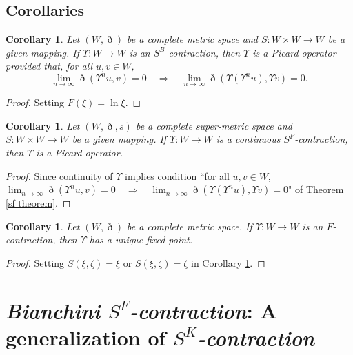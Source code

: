 \documentclass[pdflatex,sn-mathphys-num]{sn-jnl}%
\theoremstyle{thmstyleone}%
\theoremstyle{thmstyletwo}%
\newtheorem{corollary}[theorem]{Corollary}
\theoremstyle{thmstylethree}%
\begin{document}
\subsection{Corollaries}

    \begin{corollary}\cite{bessem}
   Let $(W,\eth)$ be a complete metric space and $S:W\times W \to W$ be a given mapping. 
If $\Upsilon  : W \to W$ is an \textit{$S^B$-contraction}, then $\Upsilon $ is a \textit{Picard operator} provided that, for all $u,v \in W$,
\[
\lim_{n \to \infty} \eth(\Upsilon^n u, v) = 0 
\quad \Longrightarrow \quad 
\lim_{n \to \infty} \eth(\Upsilon(\Upsilon^n u), \Upsilon  v) = 0.
\]
\end{corollary}
\begin{proof}
    Setting $F(\xi)=\ln \xi $.
\end{proof}
   \begin{corollary}\label{sfcol2}
    Let $(W,\eth,s)$ be a complete super-metric space and $S:W\times W \to W$ be a given mapping. 
If $\Upsilon  : W \to W$ is a continuous \textit{$S^F$-contraction}, then $\Upsilon $ is a \textit{Picard operator}.
\end{corollary}
\begin{proof}
    Since continuity of $\Upsilon $ implies condition “for all $u,v \in W$, $\lim_{n \to \infty} \eth(\Upsilon^n u, v) = 0 
\quad \Longrightarrow \quad 
\lim_{n \to \infty} \eth(\Upsilon(\Upsilon^n u), \Upsilon  v) = 0$"
of Theorem \ref{sf theorem}.
\end{proof}
\begin{corollary}\cite{wardowski}
     Let $(W,\eth)$ be a complete metric space. If $\Upsilon :W\to W$ is an $F$-contraction, then $\Upsilon $ has a unique fixed point.
\end{corollary}
\begin{proof}
    Setting $S(\xi,\zeta)=\xi$ or $S(\xi,\zeta)=\zeta $ in Corollary \ref{sfcol2}.
\end{proof}
\section{\texorpdfstring{\textit{Bianchini $S^F$-contraction}: A generalization of \textit{$S^K$-contraction}}
{Bianchini SF-Contraction: A generalization of SK-Contraction}}
\end{document}
